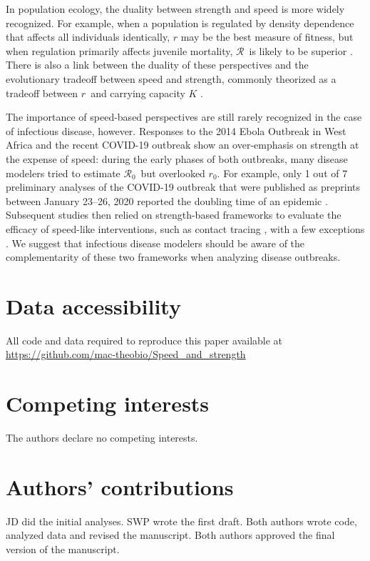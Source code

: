 \documentclass[12pt]{article}
\newcommand{\RR}{\ensuremath{{\mathcal R}}}
\newcommand{\Rx}[1]{\ensuremath{\RR_{\mathrm{#1}}}}
\newcommand{\Ro}{\Rx{0}}
\newcommand{\rr}{\ensuremath{{r}}}
\newcommand{\rx}[1]{\ensuremath{\rr_{\mathrm{#1}}}}
\newcommand{\ro}{\rx{0}}
\begin{document}
In population ecology, the duality between strength and speed is more widely recognized.
For example, when a population is regulated by density dependence that affects all individuals identically, $r$ may be the best measure of fitness, 
but when regulation primarily affects juvenile mortality, \RR\ is likely to be superior \citep{mylius1995evolutionarily,pasztor1996r0}.
There is also a link between the duality of these perspectives and the evolutionary tradeoff between speed and strength, commonly theorized as a tradeoff between \rr\ and carrying capacity $K$ \cite{Pianka70}.

The importance of speed-based perspectives are still rarely recognized in the case of infectious disease, however. 
Responses to the 2014 Ebola Outbreak in West Africa and the recent COVID-19 outbreak show an over-emphasis on strength at the expense of speed:   
during the early phases of both outbreaks, many disease modelers tried to estimate \Ro\ but overlooked \ro.
For example, only 1 out of 7 preliminary analyses of the COVID-19 outbreak that were published as preprints between January 23--26, 2020 reported the doubling time of an epidemic \citep{bedfordncov, imaincov, liuncov, majumderncov, readncov, riouncov, zhaoncov}.
Subsequent studies then relied on strength-based frameworks to evaluate the efficacy of speed-like interventions, such as contact tracing \cite{hellewell2020feasibility,kretzschmar2020impact,kucharski2020contact}, with a few exceptions \cite{ferretti2020quantifying}.
We suggest that infectious disease modelers should be aware of the complementarity of these two frameworks when analyzing disease outbreaks.



\section*{Data accessibility}

All code and data required to reproduce this paper available at \url{https://github.com/mac-theobio/Speed_and_strength}

\section*{Competing interests}

The authors declare no competing interests.

\section*{Authors’ contributions}

JD did the initial analyses. SWP wrote the first draft. Both authors wrote code, analyzed data and revised the manuscript. Both authors approved the final version of the manuscript.
\end{document}
